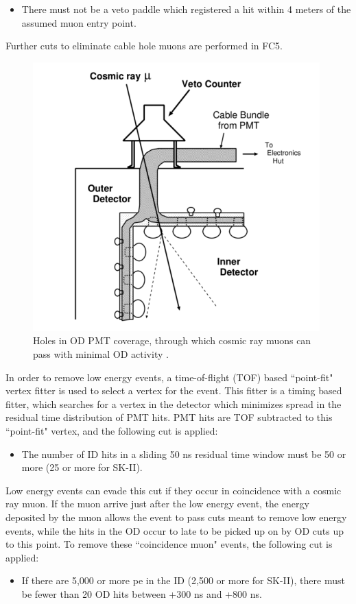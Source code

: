 \begin{itemize}
\item There must not be a veto paddle which registered a hit within 4 meters of the assumed muon entry point.
\end{itemize} 
Further cuts to eliminate cable hole muons are performed in FC5.
\begin{figure}
\centering
\includegraphics[width=0.5 \textwidth,keepaspectratio=true]{figures/Cable_muon.png}
\caption{Holes in OD PMT coverage, through which cosmic ray muons can pass with minimal OD activity \cite{Gustafson:2016dh}.}
\label{fig:cable_muon}
\end{figure}
\par
In order to remove low energy events, a time-of-flight (TOF) based ``point-fit" vertex fitter is used to select a vertex for the event.  This fitter is a timing based fitter, which searches for a vertex in the detector which minimizes spread in the residual time distribution of PMT hits.  PMT hits are TOF subtracted to this ``point-fit" vertex, and the following cut is applied:
\begin{itemize}
\item The number of ID hits in a sliding 50 ns residual time window must be 50 or more (25 or more for SK-II).
\end{itemize}
Low energy events can evade this cut if they occur in coincidence with a cosmic ray muon.  If the muon arrive just after the low energy event, the energy deposited by the muon allows the event to pass cuts meant to remove low energy events, while the hits in the OD occur to late to be picked up on by OD cuts up to this point.  To remove these ``coincidence muon" events, the following cut is applied:
\begin{itemize}
\item If there are 5,000 or more pe in the ID (2,500 or more for SK-II), there must be fewer than 20 OD hits between +300 ns and +800 ns.
\end{itemize}  

